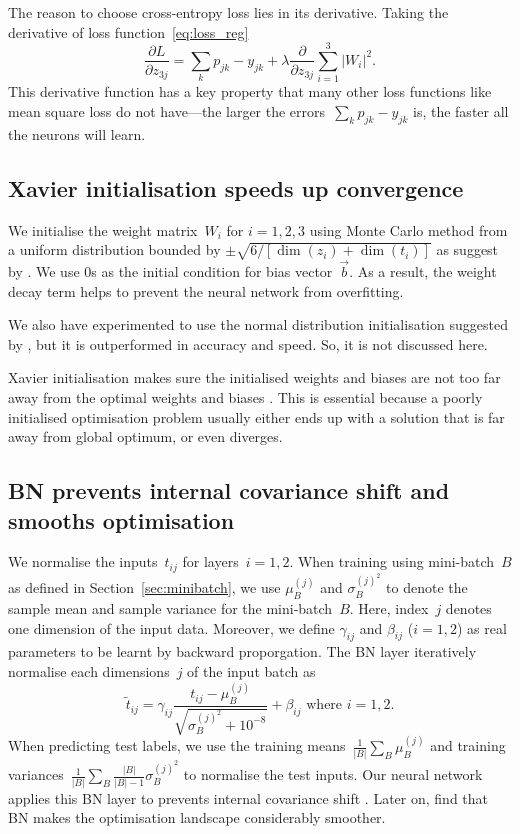 The reason to choose cross-entropy loss lies in its derivative. Taking the derivative of loss function~\eqref{eq:loss_reg}
\begin{equation*}
  \frac{\partial L}{\partial z_{3j}}=\sum_k p_{jk}-y_{jk}+\lambda\frac{\partial }{\partial z_{3j}}\sum _{i=1}^3\left|W_i\right|^2.  
\end{equation*}
This derivative function has a key property that many other loss functions like mean square loss do not have---the larger the errors~$\sum_k p_{jk}-y_{jk}$ is, the faster all the neurons will learn.

\subsection{Xavier initialisation speeds up convergence\label{sec:xav}}
We initialise the weight matrix~$W_i$ for $i=1,2,3$ using Monte Carlo method from a uniform distribution bounded by $\pm \sqrt{6/\left[\dim(z_i)+\dim(t_i)\right]}$ as suggest by \citet{pmlr-v9-glorot10a}. We use $0$s as the initial condition for bias vector~$\vec b$. As a result, the weight decay term helps to prevent the neural network from overfitting.

We also have experimented to use the normal distribution initialisation suggested by \citet{pmlr-v9-glorot10a}, but it is outperformed in accuracy and speed. So, it is not discussed here.

Xavier initialisation makes sure the initialised weights and biases are not too far away from the optimal weights and biases \citep{pmlr-v9-glorot10a}. This is essential because a poorly initialised optimisation problem usually either ends up with a solution that is far away from global optimum, or even diverges.

\subsection{BN prevents internal covariance shift and smooths optimisation}
We normalise the inputs~$t_{ij}$ for layers~$i=1,2$. When training using mini-batch~$B$ as defined in Section~\ref{sec:minibatch}, we use $\mu_B^{(j)}$ and $\sigma_B^{(j)^2}$ to denote the sample mean and sample variance for the mini-batch~$B$. Here, index~$j$ denotes one dimension of the input data. Moreover, we define $\gamma_{ij}$ and $\beta_{ij}$ ($i=1,2$) as real parameters to be learnt by backward proporgation. The BN layer iteratively normalise each dimensions~$j$ of the input batch as
\begin{equation}
     {\tilde {t}}_{ij}=\gamma_{ij}\frac {{t}_{ij}-\mu _{B}^{(j)}}{\sqrt {\sigma _{B}^{(j)^{2}}+10^{-8} }}+\beta_{ij} \text{ where } i=1,2.
\end{equation}
When predicting test labels, we use the training means~$\frac{1}{\left|B\right|}\sum_B \mu_B^{(j)}$ and training  variances~$\frac{1}{\left|B\right|}\sum_B \frac{\left|B\right|}{\left|B\right|-1}\sigma_B^{(j)^2}$ to normalise the test inputs.
Our neural network applies this BN layer to prevents internal covariance shift \citep{pmlr-v37-ioffe15}. Later on, \citet{NIPS20187515} find that BN makes the optimisation landscape considerably smoother.

